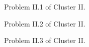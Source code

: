 \begin{cluster}[Cluster II]
\begin{problem}
Problem II.1 of Cluster II.
\end{problem}


\begin{problem}
Problem II.2 of Cluster II.
\end{problem}

\begin{flex}
\begin{problem}
Problem II.3 of Cluster II.
\end{problem}
\begin{hint}
\end{hint}
\end{flex}
\end{cluster}
